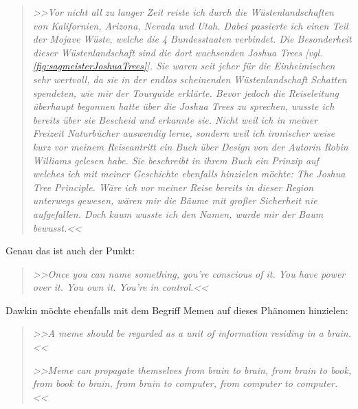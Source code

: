 \begin{quote}
	\textsl{>>Vor nicht all zu langer Zeit reiste ich durch die Wüstenlandschaften von Kalifornien, Arizona, Nevada und Utah. Dabei passierte ich einen Teil der Mojave Wüste, welche die 4 Bundesstaaten verbindet. Die Besonderheit dieser Wüstenlandschaft sind die dort wachsenden Joshua Trees [vgl. \autoref{fig:sagmeisterJoshuaTrees}]. Sie waren seit jeher für die Einheimischen sehr wertvoll, da sie in der endlos scheinenden Wüstenlandschaft Schatten spendeten, wie mir der Tourguide erklärte. Bevor jedoch die Reiseleitung überhaupt begonnen hatte über die Joshua Trees zu sprechen, wusste ich bereits über sie Bescheid und erkannte sie. Nicht weil ich in meiner Freizeit Naturbücher auswendig lerne, sondern weil ich ironischer weise kurz vor meinem Reiseantritt ein Buch über Design von der Autorin Robin Williams gelesen habe. Sie beschreibt in ihrem Buch ein Prinzip auf welches ich mit meiner Geschichte ebenfalls hinzielen möchte: The Joshua Tree Principle. Wäre ich vor meiner Reise bereits in dieser Region unterwegs gewesen, wären mir die Bäume mit großer Sicherheit nie aufgefallen. Doch kaum wusste ich den Namen, wurde mir der Baum bewusst.<<}
\begin{flushright}\citep{Sagmeister:2008}\end{flushright}
\end{quote}

Genau das ist auch der Punkt:

\begin{quote}
	\textsl{>>Once you can name something, you’re conscious of it. You have power over it. You own it. You’re in control.<<}
\begin{flushright}\citep{Williams:1994}\end{flushright}
\end{quote}

Dawkin möchte ebenfalls mit dem Begriff Memen auf dieses Phänomen hinzielen: 

\begin{quote}
	\textsl{>>A meme should be regarded as a unit of information residing in a brain.<<}
	\begin{flushright}\citep{Dawkins:1982}\end{flushright}
	\smallskip
	\textsl{>>Meme can propagate themselves from brain to brain, from brain to book, from book to brain, from brain to computer, from computer to computer.<<}
	\begin{flushright}\citep{Dawkins:1986}\end{flushright}
\end{quote}

